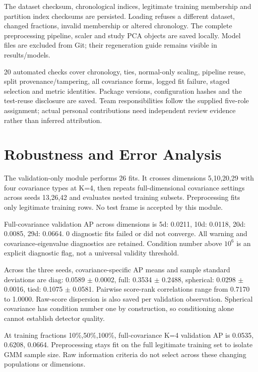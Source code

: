 \documentclass[conference]{IEEEtran}
\begin{document}
The dataset checksum, chronological indices, legitimate training membership and partition index checksums are persisted. Loading refuses a different dataset, changed fractions, invalid membership or altered chronology. The complete preprocessing pipeline, scaler and study PCA objects are saved locally. Model files are excluded from Git; their regeneration guide remains visible in results/models.

20 automated checks cover chronology, ties, normal-only scaling, pipeline reuse, split provenance/tampering, all covariance forms, logged fit failure, staged selection and metric identities. Package versions, configuration hashes and the test-reuse disclosure are saved. Team responsibilities follow the supplied five-role assignment; actual personal contributions need independent review evidence rather than inferred attribution.


\section{Robustness and Error Analysis}
The validation-only module performs 26 fits. It crosses dimensions 5,10,20,29 with four covariance types at K=4, then repeats full-dimensional covariance settings across seeds 13,26,42 and evaluates nested training subsets. Preprocessing fits only legitimate training rows. No test frame is accepted by this module.

Full-covariance validation AP across dimensions is 5d: 0.0211, 10d: 0.0118, 20d: 0.0085, 29d: 0.0664. 0 diagnostic fits failed or did not converge. All warning and covariance-eigenvalue diagnostics are retained. Condition number above $10^6$ is an explicit diagnostic flag, not a universal validity threshold.

Across the three seeds, covariance-specific AP means and sample standard deviations are diag: 0.0589 $\pm$ 0.0002, full: 0.3534 $\pm$ 0.2488, spherical: 0.0298 $\pm$ 0.0016, tied: 0.1075 $\pm$ 0.0581. Pairwise score-rank correlations range from 0.7170 to 1.0000. Raw-score dispersion is also saved per validation observation. Spherical covariance has condition number one by construction, so conditioning alone cannot establish detector quality.

At training fractions 10\%,50\%,100\%, full-covariance K=4 validation AP is 0.0535, 0.6208, 0.0664. Preprocessing stays fit on the full legitimate training set to isolate GMM sample size. Raw information criteria do not select across these changing populations or dimensions.
\end{document}
